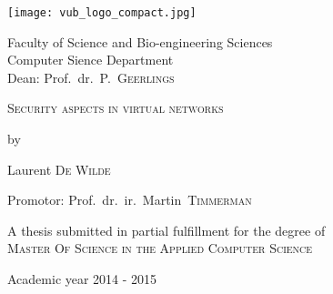 

\begin{titlepage}


\fontsize{12pt}{14pt}
\selectfont

\begin{center}

\texttt{[image: vub\_logo\_compact.jpg]}

\vspace{0.5cm}

Faculty of Science and Bio-engineering Sciences\\
Computer Sience Department\\
Dean: Prof.~dr.~P.~\textsc{Geerlings}

\vspace{2.0cm}

\fontsize{17.28pt}{21pt}
\selectfont

\textsc{Security aspects in virtual networks}

\fontsize{12pt}{14pt}
\selectfont

\vspace{.6cm}

by 

\vspace{.4cm}

Laurent \textsc{De Wilde}

\vspace{2.5cm}

Promotor: Prof.~dr.~ir.~Martin~\textsc{Timmerman}

\vspace{1.5cm}

A thesis submitted in partial fulfillment for the degree  of\\
\textsc{Master Of Science in the Applied Computer Science}

\vspace{0.75cm}

Academic year 2014 - 2015

\end{center}
\end{titlepage}

\thispagestyle{empty}